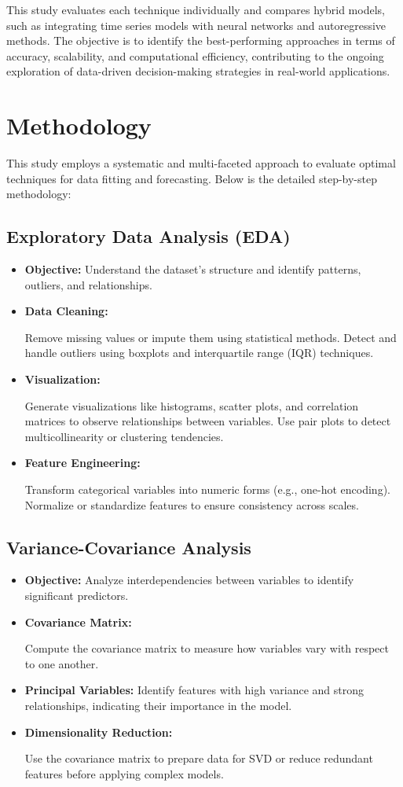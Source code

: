 \documentclass[english,12pt, titlepage]{article}
\begin{document}
	This study evaluates each technique individually and compares hybrid models, such as integrating time series models with neural networks and autoregressive methods. The objective is to identify the best-performing approaches in terms of accuracy, scalability, and computational efficiency, contributing to the ongoing exploration of data-driven decision-making strategies in real-world applications.
	
	
	\newpage
	\section{Methodology}
	This study employs a systematic and multi-faceted approach to evaluate optimal techniques for data fitting and forecasting. Below is the detailed step-by-step methodology:
	\subsection{Exploratory Data Analysis (EDA)}
	
	\begin{itemize}
		\item \textbf{Objective:} Understand the dataset's structure and identify patterns, outliers, and relationships.
		\item \textbf{Data Cleaning:}
		
		Remove missing values or impute them using statistical methods.
		Detect and handle outliers using boxplots and interquartile range (IQR) techniques.
		\item \textbf{	Visualization:}
		
		Generate visualizations like histograms, scatter plots, and correlation matrices to observe relationships between variables.
		Use pair plots to detect multicollinearity or clustering tendencies.
		\item 	\textbf{Feature Engineering:}
		
		Transform categorical variables into numeric forms (e.g., one-hot encoding).
		Normalize or standardize features to ensure consistency across scales.
	\end{itemize}
	\subsection{ Variance-Covariance Analysis}
	\begin{itemize}
		\item 	\textbf{Objective:} Analyze interdependencies between variables to identify significant predictors.
		\item \textbf{Covariance Matrix:}
		
		Compute the covariance matrix to measure how variables vary with respect to one another.
		
		\item \textbf{Principal Variables: }Identify features with high variance and strong relationships, indicating their importance in the model.
		\item \textbf{	Dimensionality Reduction:}
		
		Use the covariance matrix to prepare data for SVD or reduce redundant features before applying complex models.
	\end{itemize}
	
\end{document}
